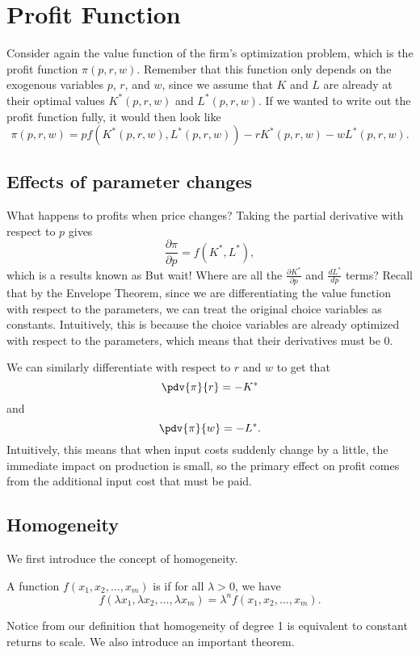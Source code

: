\section{Profit Function}

Consider again the value function of the firm's optimization problem, which is the profit function $\pi(p, r, w)$. Remember that this function only depends on the exogenous variables $p$, $r$, and $w$, since we assume that $K$ and $L$ are already at their optimal values $K^*(p, r, w)$ and $L^*(p, r, w)$. If we wanted to write out the profit function fully, it would then look like
$$\pi(p, r, w) = pf(K^*(p, r, w), L^*(p, r, w)) - rK^*(p, r, w) - wL^*(p, r, w).$$

\subsection*{Effects of parameter changes}

What happens to profits when price changes? Taking the partial derivative with respect to $p$ gives
$$\frac{\partial \pi}{\partial p} = f(K^*, L^*),$$
which is a results known as  But wait! Where are all the $\frac{\partial K^*}{\partial p}$ and $\frac{d L^*}{d p}$ terms? Recall that by the Envelope Theorem, since we are differentiating the value function with respect to the parameters, we can treat the original choice variables as constants. Intuitively, this is because the choice variables are already optimized with respect to the parameters, which means that their derivatives must be 0. 

We can similarly differentiate with respect to $r$ and $w$ to get that 
$$\pdv{\pi}{r} = -K^*$$
and
$$\pdv{\pi}{w} = -L^*.$$
Intuitively, this means that when input costs suddenly change by a little, the immediate impact on production is small, so the primary effect on profit comes from the additional input cost that must be paid.

\subsection*{Homogeneity}
We first introduce the concept of homogeneity.
\begin{definition*} \label{def:homogeneity}
A function $f(x_1, x_2, \ldots, x_m)$ is  if for all $\lambda > 0$, we have 
$$f\left(\lambda x_{1}, \lambda x_{2}, \ldots, \lambda x_{m}\right)=\lambda^{n} f\left(x_{1}, x_{2}, \ldots, x_{m}\right).$$
\end{definition*}
Notice from our definition that homogeneity of degree 1 is equivalent to constant returns to scale. We also introduce an important theorem.

